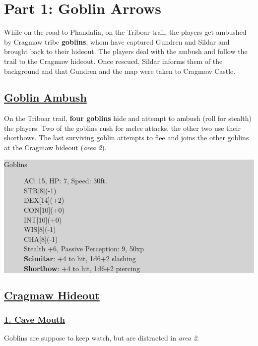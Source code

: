 	\section{Part 1: Goblin Arrows}

While on the road to Phandalin, on the Triboar trail, the players get ambushed by Cragmaw tribe \textbf{goblins}, whom have captured Gundren and Sildar and brought back to their hideout. The players deal with the ambush and follow the trail to the Cragmaw hideout. Once rescued, Sildar informs them of the background and that Gundren and the map were taken to Cragmaw Castle.



\subsection{\underline{Goblin Ambush}}
On the Triboar trail, \textbf{four goblins} hide and attempt to ambush (roll for stealth) the players. Two of the goblins rush for melee attacks, the other two use their shortbows. The last surviving goblin attempts to flee and joins the other goblins at the Cragmaw hideout (\emph{area 2}).

\colorbox{lightgray}{\begin{minipage}{0.4\textwidth}
\begin{description}
	\item[Goblins] 
	AC: 15, HP: 7, Speed: 30ft.
	\\ STR[8](-1) 
	\\ DEX[14](+2)
	\\ CON[10](+0)
	\\ INT[10](+0)
	\\ WIS[8](-1)
	\\ CHA[8](-1) 
	\\ Stealth +6, Passive Perception: 9, 50xp
	\\ \textbf{Scimitar}: +4 to hit, 1d6+2 slashing
	\\ \textbf{Shortbow}: +4 to hit, 1d6+2 piercing
\end{description}
\end{minipage}}
\break

\subsection{\underline{Cragmaw Hideout}}
\subsubsection*{\underline{1. Cave Mouth}}
Goblins are suppose to keep watch, but are distracted in \emph{area 2}.

